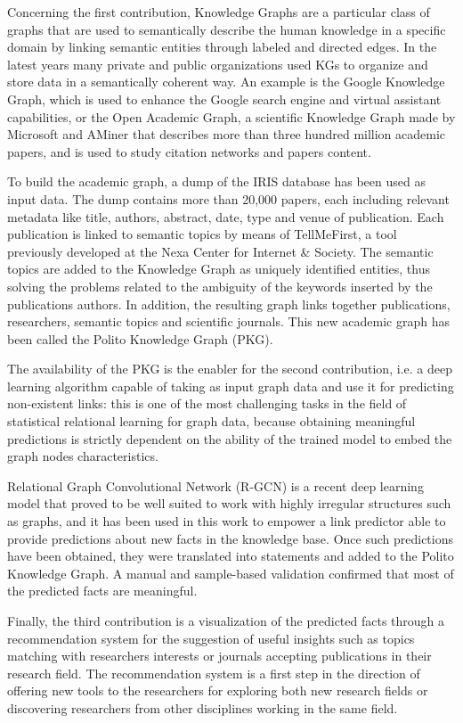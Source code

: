 \documentclass[english, 12pt]{article}
\begin{document}
Concerning the first contribution, Knowledge Graphs are a particular class of
graphs that are used to semantically describe the human knowledge in a specific
domain by linking semantic entities through labeled and directed edges.
In the latest years many private and public organizations used KGs to organize
and store data in a semantically coherent way. An example is the Google
Knowledge Graph, which is used to enhance the Google search engine and virtual
assistant capabilities, or the Open Academic Graph, a scientific Knowledge
Graph made by Microsoft and AMiner that describes more than three hundred
million academic papers, and is used to study citation networks and
papers content.

To build the academic graph, a dump of the IRIS database has been used as
input data.
The dump contains more than 20,000 papers, each including relevant metadata
like title, authors, abstract, date, type and venue of publication. Each
publication is linked to semantic topics by means of TellMeFirst, a tool
previously developed at the Nexa Center for Internet \& Society.
The semantic topics are added to the Knowledge Graph as uniquely identified
entities, thus solving the problems related to the ambiguity of the keywords
inserted by the publications authors. In addition, the resulting graph links
together publications, researchers, semantic topics and scientific journals.
This new academic graph has been called the Polito Knowledge Graph (PKG).

The availability of the PKG is the enabler for the second contribution, i.e. a
deep learning algorithm capable of taking as input graph data and use it for
predicting non-existent links: this is one of the most challenging tasks in the
field of statistical relational learning for graph data, because obtaining
meaningful predictions is strictly dependent on the ability of the trained
model to embed the graph nodes characteristics.

Relational Graph Convolutional Network (R-GCN) is a recent deep learning
model that proved to be well suited to work with highly irregular structures
such as graphs, and it has been used in this work to empower a link predictor
able to provide predictions about new facts in the knowledge base.
Once such predictions have been obtained, they
were translated into statements and added to the Polito Knowledge Graph.
A manual and sample-based validation confirmed that most of the predicted
facts are meaningful.

Finally, the third contribution is a visualization of the predicted facts
through a recommendation system for the suggestion of useful insights such
as topics matching with researchers interests or journals accepting publications
in their research field. The recommendation system is a first step in the
direction of offering new tools to the researchers for exploring both new
research fields or discovering researchers from other disciplines working
in the same field.
\end{document}
